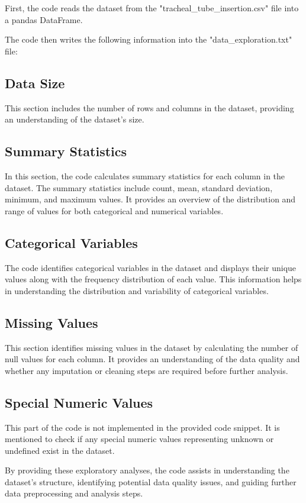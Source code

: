 \documentclass[11pt]{article}
\begin{document}
First, the code reads the dataset from the "tracheal\_tube\_insertion.csv" file into a pandas DataFrame. 

The code then writes the following information into the "data\_exploration.txt" file:

\subsection{Data Size}
This section includes the number of rows and columns in the dataset, providing an understanding of the dataset's size.

\subsection{Summary Statistics}
In this section, the code calculates summary statistics for each column in the dataset. The summary statistics include count, mean, standard deviation, minimum, and maximum values. It provides an overview of the distribution and range of values for both categorical and numerical variables.

\subsection{Categorical Variables}
The code identifies categorical variables in the dataset and displays their unique values along with the frequency distribution of each value. This information helps in understanding the distribution and variability of categorical variables.

\subsection{Missing Values}
This section identifies missing values in the dataset by calculating the number of null values for each column. It provides an understanding of the data quality and whether any imputation or cleaning steps are required before further analysis.

\subsection{Special Numeric Values}
This part of the code is not implemented in the provided code snippet. It is mentioned to check if any special numeric values representing unknown or undefined exist in the dataset.

By providing these exploratory analyses, the code assists in understanding the dataset's structure, identifying potential data quality issues, and guiding further data preprocessing and analysis steps.
\end{document}
